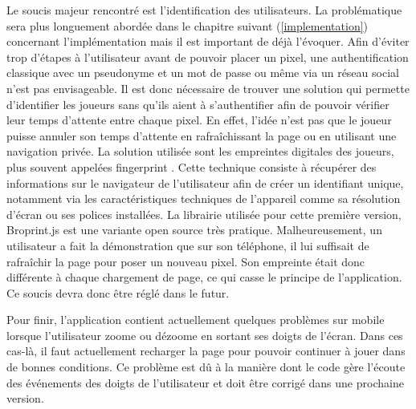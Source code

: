 Le soucis majeur rencontré est l'identification des utilisateurs. La problématique sera plus longuement abordée dans le chapitre suivant (\ref{implementation}) concernant l'implémentation mais il est important de déjà l'évoquer. Afin d'éviter trop d'étapes à l'utilisateur avant de pouvoir placer un pixel, une authentification classique avec un pseudonyme et un mot de passe ou même via un réseau social n'est pas envisageable. Il est donc nécessaire de trouver une solution qui permette d'identifier les joueurs sans qu'ils aient à s'authentifier afin de pouvoir vérifier leur temps d'attente entre chaque pixel. En effet, l'idée n'est pas que le joueur puisse annuler son temps d'attente en rafraîchissant la page ou en utilisant une navigation privée. La solution utilisée sont les empreintes digitales des joueurs, plus souvent appelées fingerprint \cite{devicefingerprint}. Cette technique consiste à récupérer des informations sur le navigateur de l'utilisateur afin de créer un identifiant unique, notamment via les caractéristiques techniques de l'appareil comme sa résolution d'écran ou ses polices installées. La librairie utilisée pour cette première version, Broprint.js \cite{broprintjs} est une variante open source très pratique. Malheureusement, un utilisateur a fait la démonstration que sur son téléphone, il lui suffisait de rafraîchir la page pour poser un nouveau pixel. Son empreinte était donc différente à chaque chargement de page, ce qui casse le principe de l'application. Ce soucis devra donc être réglé dans le futur.

Pour finir, l'application contient actuellement quelques problèmes sur mobile lorsque l'utilisateur zoome ou dézoome en sortant ses doigts de l'écran. Dans ces cas-là, il faut actuellement recharger la page pour pouvoir continuer à jouer dans de bonnes conditions. Ce problème est dû à la manière dont le code gère l'écoute des événements des doigts de l'utilisateur et doit être corrigé dans une prochaine version.
